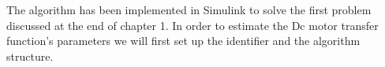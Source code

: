 The algorithm has been implemented in Simulink to solve the first problem discussed at the end of chapter 1.  In order to estimate the Dc motor transfer function's parameters we will first set up the identifier and the algorithm structure.
%
%
%
%
%
%
%
%
%
%

